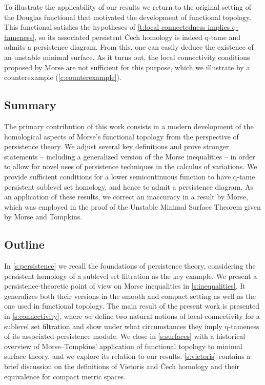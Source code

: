 To illustrate the applicability of our results we return to the original setting of the Douglas functional that motivated the development of functional topology.
This functional satisfies the hypotheses of \cref{t:local connectedness implies q-tameness}, so its associated persistent \v{C}ech homology is indeed q-tame and admits a persistence diagram.
From this, one can easily deduce the existence of an unstable minimal surface.
As it turns out, the local connectivity conditions proposed by Morse \cite{Morse.1938,Morse.1939,Morse.1940} are not sufficient for this purpose, which we illustrate by a counterexample (\cref{c:counterexample}).


\subsection*{Summary}

The primary contribution of this work consists in a modern development of the homological aspects of Morse's functional topology from the perspective of persistence theory.
We adjust several key definitions and prove stronger statements -- including a generalized version of the Morse inequalities -- in order to allow for novel uses of persistence techniques in the calculus of variations.
We provide sufficient conditions for a lower semicontinuous function to have q-tame persistent sublevel set homology, and hence to admit a persistence diagram.
As an application of these results, we correct an inaccuracy in a result by Morse, which was employed in the proof of the Unstable Minimal Surface Theorem given by Morse and Tompkins.


\subsection*{Outline}

In \cref{s:persistence} we recall the foundations of persistence theory, considering the persistent homology of a sublevel set filtration as the key example.
We present a persistence-theoretic point of view on Morse inequalities in \cref{s:inequalities}.
It generalizes both their versions in the smooth and compact setting as well as the one used in functional topology.
The main result of the present work is presented in \cref{s:connectivity}, where we define two natural notions of local-connectivity for a sublevel set filtration and show under what circumstances they imply q-tameness of its associated persistence module.
We close in \cref{s:surfaces} with a historical overview of Morse--Tompkins' application of functional topology to minimal surface theory, and we explore its relation to our results.
\cref{s:vietoris} contains a brief discussion on the definitions of Vietoris and \v{C}ech homology and their equivalence for compact metric spaces.
